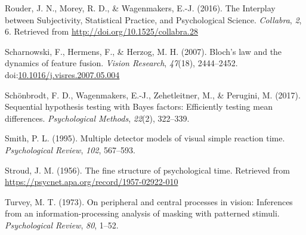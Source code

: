 \documentclass[
  ,man]{apa6}
\newlength{\cslhangindent}
\newlength{\cslentryspacingunit} %
\newenvironment{CSLReferences}[2] %
 {%
  \setlength{\parindent}{0pt}
  \ifodd #1
  \let\oldpar\par
  \def\par{\hangindent=\cslhangindent\oldpar}
  \fi
  \setlength{\parskip}{#2\cslentryspacingunit}
 }%
 {}
\begin{document}
\begin{CSLReferences}{1}{0}
\leavevmode{}%
Rouder, J. N., Morey, R. D., \& Wagenmakers, E.-J. (2016). The {Interplay} between {Subjectivity}, {Statistical Practice}, and {Psychological Science}. \emph{Collabra}, \emph{2}, 6. Retrieved from \url{http://doi.org/10.1525/collabra.28}

\leavevmode{}%
Scharnowski, F., Hermens, F., \& Herzog, M. H. (2007). Bloch's law and the dynamics of feature fusion. \emph{Vision Research}, \emph{47}(18), 2444--2452. doi:\href{https://doi.org/10.1016/j.visres.2007.05.004}{10.1016/j.visres.2007.05.004}

\leavevmode{}%
Schönbrodt, F. D., Wagenmakers, E.-J., Zehetleitner, M., \& Perugini, M. (2017). Sequential hypothesis testing with {Bayes} factors: {Efficiently} testing mean differences. \emph{Psychological Methods}, \emph{22}(2), 322--339.

\leavevmode{}%
Smith, P. L. (1995). Multiple detector models of visual simple reaction time. \emph{Psychological Review}, \emph{102}, 567--593.

\leavevmode{}%
Stroud, J. M. (1956). The fine structure of psychological time. Retrieved from \url{https://psycnet.apa.org/record/1957-02922-010}

\leavevmode{}%
Turvey, M. T. (1973). On peripheral and central processes in vision: {Inferences} from an information-processing analysis of masking with patterned stimuli. \emph{Psychological Review}, \emph{80}, 1--52.

\end{CSLReferences}
\end{document}
